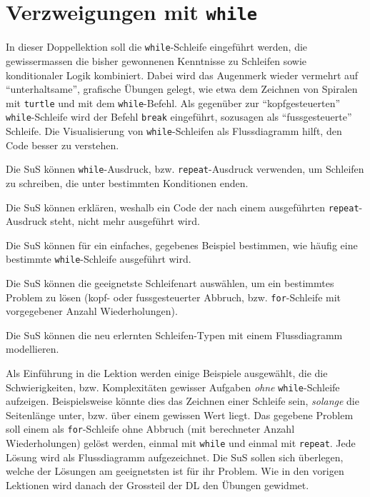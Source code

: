 \section{Verzweigungen mit \texorpdfstring{\lstinline|while|}{while}}
\begin{myExBox}
In dieser Doppellektion soll die \lstinline|while|-Schleife eingeführt werden, die gewissermassen die bisher gewonnenen Kenntnisse zu Schleifen sowie konditionaler Logik kombiniert. Dabei wird das Augenmerk wieder vermehrt auf ``unterhaltsame'', grafische Übungen gelegt, wie etwa dem Zeichnen von Spiralen mit \lstinline|turtle| und mit dem \lstinline|while|-Befehl. Als gegenüber zur ``kopfgesteuerten'' \lstinline|while|-Schleife wird der Befehl \lstinline|break| eingeführt, sozusagen als ``fussgesteuerte'' Schleife. Die Visualisierung von \lstinline|while|-Schleifen als Flussdiagramm hilft, den Code besser zu verstehen.

\begin{todolist}
    \item Die SuS können \lstinline|while|-Ausdruck, bzw. \lstinline|repeat|-Ausdruck verwenden, um Schleifen zu schreiben, die unter bestimmten Konditionen enden.
    \item Die SuS können erklären, weshalb ein Code der nach einem ausgeführten \lstinline|repeat|-Ausdruck steht, nicht mehr ausgeführt wird.
    \item Die SuS können für ein einfaches, gegebenes Beispiel bestimmen, wie häufig eine bestimmte \lstinline|while|-Schleife ausgeführt wird.
    \item Die SuS können die geeignetste Schleifenart auswählen, um ein bestimmtes Problem zu lösen (kopf- oder fussgesteuerter Abbruch, bzw. \lstinline|for|-Schleife mit vorgegebener Anzahl Wiederholungen).
    \item Die SuS können die neu erlernten Schleifen-Typen mit einem Flussdiagramm modellieren.
\end{todolist}


Als Einführung in die Lektion werden einige Beispiele ausgewählt, die die Schwierigkeiten, bzw. Komplexitäten gewisser Aufgaben \textit{ohne} \lstinline|while|-Schleife aufzeigen. Beispielsweise könnte dies das Zeichnen einer Schleife sein, \textit{solange} die Seitenlänge unter, bzw. über einem gewissen Wert liegt. Das gegebene Problem soll einem als \lstinline|for|-Schleife ohne Abbruch (mit berechneter Anzahl Wiederholungen) gelöst werden, einmal mit \lstinline|while| und einmal mit \lstinline|repeat|. Jede Lösung wird als Flussdiagramm aufgezeichnet. Die SuS sollen sich überlegen, welche der Lösungen am geeignetsten ist für ihr Problem. Wie in den vorigen Lektionen wird danach der Grossteil der DL den Übungen gewidmet.


\end{myExBox}
